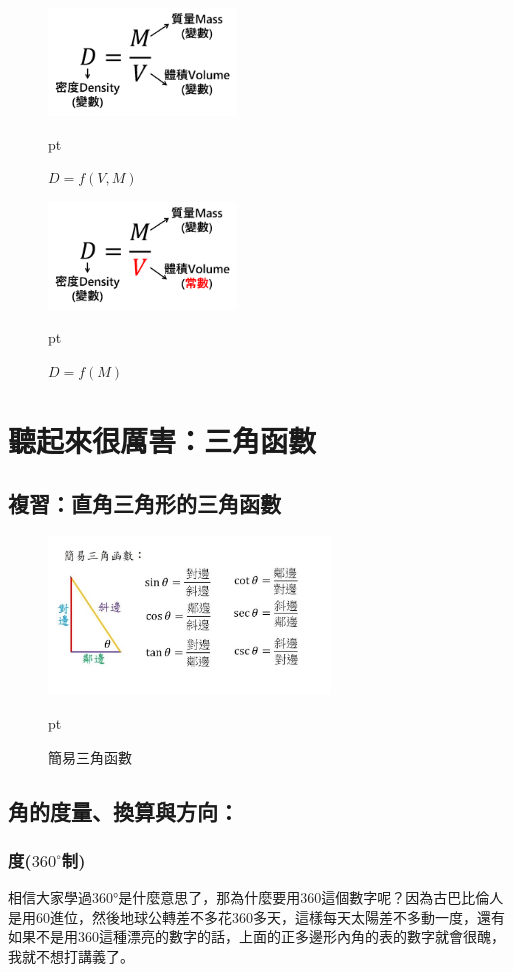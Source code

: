 \begin{enumerate}
		\begin{figure}[H]
		\centering
		\graphicspath{{physics/}}
		\includegraphics[width=5cm, center]{D1.png}
		\caption{$D=f(V,M)$}  pt
		\label{fig:D1}
		\end{figure}
		
		\begin{figure}[H]
		\centering
		\graphicspath{{physics/}}
		\includegraphics[width=5cm, center]{D2.png}
		\caption{$D=f(M)$}  pt
		\label{fig:D2}
		\end{figure}
\end{enumerate}

\section{聽起來很厲害：三角函數}
\subsection{複習：直角三角形的三角函數}
\begin{figure}[H]
\centering
\graphicspath{{physics/}}
\includegraphics[width=7.5cm, center]{tri-function.jpg}
\caption{簡易三角函數}  pt
\label{fig:tri-function}
\end{figure}
\subsection{角的度量、換算與方向：}
\subsubsection{度($360^\circ$制)}
相信大家學過360°是什麼意思了，那為什麼要用360這個數字呢？因為古巴比倫人是用60進位，然後地球公轉差不多花360多天，這樣每天太陽差不多動一度，還有如果不是用360這種漂亮的數字的話，上面的正多邊形內角的表的數字就會很醜，我就不想打講義了。
